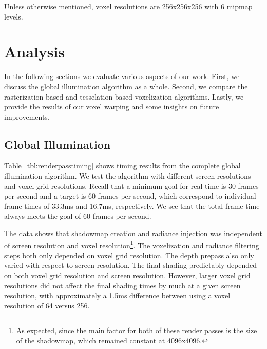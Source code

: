 Unless otherwise mentioned, voxel resolutions are 256x256x256 with 6 mipmap levels.

\section{Analysis}
In the following sections we evaluate various aspects of our work. First, we discuss the global illumination algorithm as a whole. Second, we compare the rasterization-based and tesselation-based voxelization algorithms. Lastly, we provide the results of our voxel warping and some insights on future improvements.

\subsection{Global Illumination}
Table~\ref{tbl:renderpasstiming} shows timing results from the complete global illumination algorithm. We test the algorithm with different screen resolutions and voxel grid resolutions. Recall that a minimum goal for real-time is 30 frames per second and a target is 60 frames per second, which correspond to individual frame times of 33.3ms and 16.7ms, respectively. We see that the total frame time always meets the goal of 60 frames per second.

The data shows that shadowmap creation and radiance injection was independent of screen resolution and voxel resolution\footnote{As expected, since the main factor for both of these render passes is the size of the shadowmap, which remained constant at 4096x4096.}. The voxelization and radiance filtering steps both only depended on voxel grid resolution. The depth prepass also only varied with respect to screen resolution. The final shading predictably depended on both voxel grid resolution and screen resolution. However, larger voxel grid resolutions did not affect the final shading times by much at a given screen resolution, with approximately a 1.5ms difference between using a voxel resolution of 64 versus 256.


